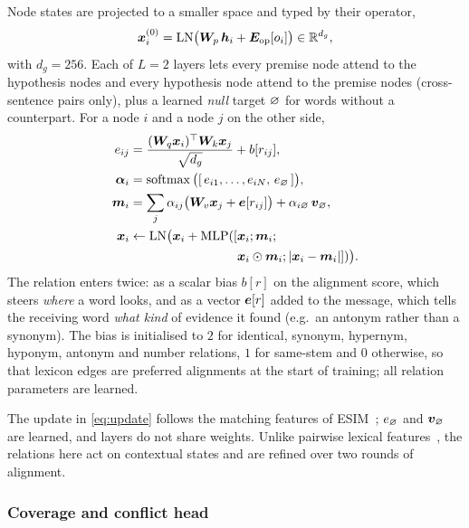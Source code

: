 Node states are projected to a smaller space and typed by their operator,
\begin{equation}
  \bm{x}^{(0)}_i = \operatorname{LN}\!\big(\bm{W}_p\,\bm{h}_i + \bm{E}_{\mathrm{op}}[o_i]\big)\in\mathbb{R}^{d_g},
  \label{eq:node}
\end{equation}
with $d_g=256$. Each of $L=2$ layers lets every premise node attend to the hypothesis nodes and every
hypothesis node attend to the premise nodes (cross-sentence pairs only), plus a learned \emph{null}
target $\varnothing$ for words without a counterpart. For a node $i$ and a node $j$ on the other side,
\begin{align}
  e_{ij} &= \frac{(\vect{W}_q\vect{x}_i)^{\top}\vect{W}_k\vect{x}_j}{\sqrt{d_g}} + b[r_{ij}],
  \label{eq:score}\\
  \vect{\alpha}_i &= \operatorname{softmax}\big([\,e_{i1},\dots,e_{iN},\,e_{\nullnode}\,]\big),
  \label{eq:align}\\
  \vect{m}_i &= \sum_j \alpha_{ij}\big(\vect{W}_v\vect{x}_j + \vect{e}[r_{ij}]\big) + \alpha_{i\nullnode}\,\vect{v}_{\nullnode},
  \label{eq:message}\\
  \vect{x}_i &\leftarrow \LN\!\big(\vect{x}_i + \MLP([\vect{x}_i;\vect{m}_i;\nonumber\\
  &\hphantom{{}\leftarrow \LN\!\big(\vect{x}_i + \MLP([}\vect{x}_i\odot\vect{m}_i;|\vect{x}_i-\vect{m}_i|])\big).
  \label{eq:update}
\end{align}
The relation enters twice: as a scalar bias $b[r]$ on the alignment score, which steers \emph{where} a
word looks, and as a vector $\bm{e}[r]$ added to the message, which tells the receiving word
\emph{what kind} of evidence it found (e.g.\ an antonym rather than a synonym). The bias is initialised
to $2$ for identical, synonym, hypernym, hyponym, antonym and number relations, $1$ for same-stem and
$0$ otherwise, so that lexicon edges are preferred alignments at the start of training; all relation
parameters are learned.

The update in \cref{eq:update} follows the matching features of
ESIM~\citep{chen2017enhanced}; $e_{\varnothing}$ and $\bm{v}_{\varnothing}$ are learned, and layers do not
share weights. Unlike pairwise lexical features~\citep{chen2018neural}, the relations here act on
contextual states and are refined over two rounds of alignment.

\subsubsection{Coverage and conflict head}
\label{sec:head}

